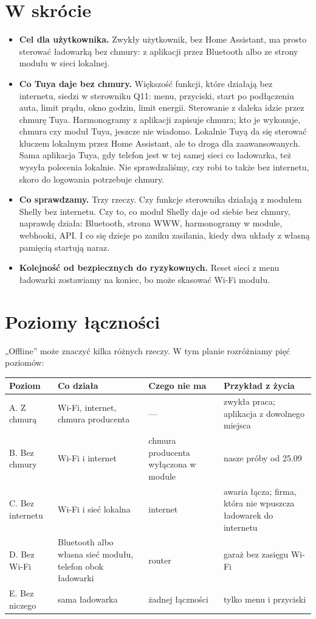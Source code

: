 \documentclass[11pt,a4paper]{article}
\begin{document}
\section*{W skrócie}

\begin{itemize}
\item \textbf{Cel dla użytkownika.} Zwykły użytkownik, bez Home Assistant, ma prosto sterować ładowarką bez chmury: z aplikacji przez Bluetooth albo ze strony modułu w sieci lokalnej.
\item \textbf{Co Tuya daje bez chmury.} Większość funkcji, które działają bez internetu, siedzi w sterowniku Q11: menu, przyciski, start po podłączeniu auta, limit prądu, okno godzin, limit energii. Sterowanie z daleka idzie przez chmurę Tuya. Harmonogramy z aplikacji zapisuje chmura; kto je wykonuje, chmura czy moduł Tuya, jeszcze nie wiadomo. Lokalnie Tuyą da się sterować kluczem lokalnym przez Home Assistant, ale to droga dla zaawansowanych. Sama aplikacja Tuya, gdy telefon jest w tej samej sieci co ładowarka, też wysyła polecenia lokalnie. Nie sprawdzaliśmy, czy robi to także bez internetu, skoro do logowania potrzebuje chmury.
\item \textbf{Co sprawdzamy.} Trzy rzeczy. Czy funkcje sterownika działają z modułem Shelly bez internetu. Czy to, co moduł Shelly daje od siebie bez chmury, naprawdę działa: Bluetooth, strona WWW, harmonogramy w module, webhooki, API. I co się dzieje po zaniku zasilania, kiedy dwa układy z własną pamięcią startują naraz.
\item \textbf{Kolejność od bezpiecznych do ryzykownych.} Reset sieci z menu ładowarki zostawiamy na koniec, bo może skasować Wi-Fi modułu.
\end{itemize}

\section{Poziomy łączności}

„Offline” może znaczyć kilka różnych rzeczy. W tym planie rozróżniamy pięć poziomów:


\begin{longtable}{>{\raggedright\arraybackslash}p{3.00cm}>{\raggedright\arraybackslash}p{4.28cm}>{\raggedright\arraybackslash}p{2.25cm}>{\raggedright\arraybackslash}p{5.31cm}}
\toprule
\rowcolor{apteallight}\textbf{Poziom} & \textbf{Co działa} & \textbf{Czego nie ma} & \textbf{Przykład z życia} \\
\midrule\endhead
\bottomrule\endfoot
A. Z chmurą & Wi-Fi, internet, chmura producenta & — & zwykła praca; aplikacja z dowolnego miejsca \\
B. Bez chmury & Wi-Fi i internet & chmura producenta wyłączona w module & nasze próby od 25.09 \\
C. Bez internetu & Wi-Fi i sieć lokalna & internet & awaria łącza; firma, która nie wpuszcza ładowarek do internetu \\
D. Bez Wi-Fi & Bluetooth albo własna sieć modułu, telefon obok ładowarki & router & garaż bez zasięgu Wi-Fi \\
E. Bez niczego & sama ładowarka & żadnej łączności & tylko menu i przyciski \\
\end{longtable}
\end{document}
